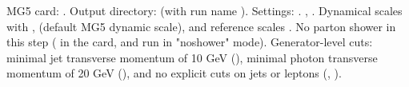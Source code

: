 {}\markdownRendererUlBeginTight
\markdownRendererUlItem MG5 card: .\markdownRendererUlItemEnd 
\markdownRendererUlItem Output directory:  (with run name ).\markdownRendererUlItemEnd 
\markdownRendererUlItem Settings:\markdownRendererInterblockSeparator
{}\markdownRendererUlBeginTight
\markdownRendererUlItem {}.\markdownRendererUlItemEnd 
\markdownRendererUlItem {}, .\markdownRendererUlItemEnd 
\markdownRendererUlItem Dynamical scales with ,  (default MG5 dynamic scale), and reference scales .\markdownRendererUlItemEnd 
\markdownRendererUlItem No parton shower in this step ( in the card, and run in "noshower" mode).\markdownRendererUlItemEnd 
\markdownRendererUlItem Generator-level cuts: minimal jet transverse momentum of 10 GeV (), minimal photon transverse momentum of 20 GeV (), and no explicit \markdownRendererInlineMath{\eta} cuts on jets or leptons (, ).\markdownRendererUlItemEnd 
\markdownRendererUlEndTight \markdownRendererUlItemEnd 
\markdownRendererUlEndTight \markdownRendererOlItemEnd 
